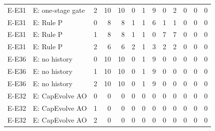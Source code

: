 \begin{table}[t]
{\begin{tabular}{@{}llrrrrrrrrrrr@{}}
E-E31 & E: one-stage gate & 2 & 10 & 10 & 0 & 1 & 9 & 0 & 2 & 0 & 0 & 0 \\
E-E31 & E: Rule P & 0 & 8 & 8 & 1 & 1 & 6 & 1 & 1 & 0 & 0 & 0 \\
E-E31 & E: Rule P & 1 & 8 & 8 & 1 & 1 & 0 & 7 & 7 & 0 & 0 & 0 \\
E-E31 & E: Rule P & 2 & 6 & 6 & 2 & 1 & 3 & 2 & 2 & 0 & 0 & 0 \\
E-E36 & E: no history & 0 & 10 & 10 & 0 & 1 & 9 & 0 & 0 & 0 & 0 & 0 \\
E-E36 & E: no history & 1 & 10 & 10 & 0 & 1 & 9 & 0 & 0 & 0 & 0 & 0 \\
E-E36 & E: no history & 2 & 10 & 10 & 0 & 1 & 9 & 0 & 0 & 0 & 0 & 0 \\
E-E32 & E: CapEvolve AO & 0 & 0 & 0 & 0 & 0 & 0 & 0 & 0 & 0 & 0 & 0 \\
E-E32 & E: CapEvolve AO & 1 & 0 & 0 & 0 & 0 & 0 & 0 & 0 & 0 & 0 & 0 \\
E-E32 & E: CapEvolve AO & 2 & 0 & 0 & 0 & 0 & 0 & 0 & 0 & 0 & 0 & 0 \\
\bottomrule
\end{tabular}}
\end{table}
